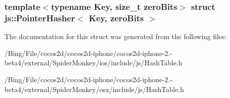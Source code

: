 \subsubsection*{template$<$typename Key, size\-\_\-t zero\-Bits$>$ struct js\-::\-Pointer\-Hasher$<$ Key, zero\-Bits $>$}



The documentation for this struct was generated from the following files\-:\begin{DoxyCompactItemize}
\item 
/\-Bing/\-File/cocos2d/cocos2d-\/iphone/cocos2d-\/iphone-\/2.-\/beta4/external/\-Spider\-Monkey/ios/include/js/Hash\-Table.\-h\item 
/\-Bing/\-File/cocos2d/cocos2d-\/iphone/cocos2d-\/iphone-\/2.-\/beta4/external/\-Spider\-Monkey/osx/include/js/Hash\-Table.\-h\end{DoxyCompactItemize}
